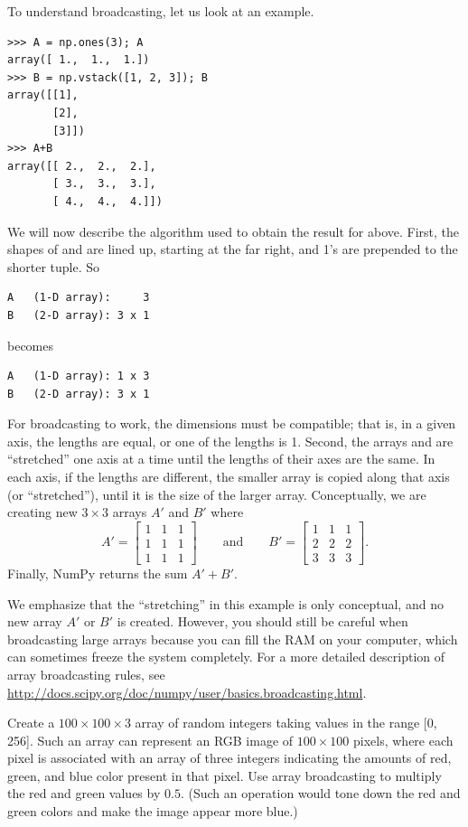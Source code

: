To understand broadcasting, let us look at an example. 
\begin{lstlisting}
>>> A = np.ones(3); A
array([ 1.,  1.,  1.])
>>> B = np.vstack([1, 2, 3]); B
array([[1],
       [2],
       [3]])
>>> A+B
array([[ 2.,  2.,  2.],
       [ 3.,  3.,  3.],
       [ 4.,  4.,  4.]])
\end{lstlisting}
We will now describe the algorithm used to obtain the result for  above. First, the shapes of  and  are lined up, starting at the far right, and 1's are prepended to the shorter tuple. So
\begin{lstlisting}
A 	(1-D array):     3
B	(2-D array): 3 x 1
\end{lstlisting}
becomes
\begin{lstlisting}
A 	(1-D array): 1 x 3
B	(2-D array): 3 x 1
\end{lstlisting}
For broadcasting to work, the dimensions must be compatible; that is, in a given axis, the lengths are equal, or one of the lengths is 1. Second, the arrays  and  are ``stretched'' one axis at a time until the lengths of their axes are the same. In each axis, if the lengths are different, the smaller array is copied along that axis (or ``stretched''), until it is the size of the larger array. Conceptually, we are creating new $3 \times 3$ arrays $A'$ and $B'$ where
\[
A' = \left[ \begin{array}{ccc}
1 & 1 & 1\\
1 & 1 & 1\\
1 & 1 & 1 \end{array} \right] \qquad \text{and} \qquad B' =  \left[ \begin{array}{ccc}
1 & 1 & 1\\
2 & 2 & 2\\
3 & 3 & 3\end{array} \right].
\]
Finally, NumPy returns the sum $A'+B'$.

We emphasize that the ``stretching'' in this example is only conceptual, and no new array $A'$ or $B'$ is created. However, 
you should still be careful when broadcasting large arrays because you can fill the 
RAM on your computer, which can sometimes freeze the system completely.
For a more detailed description of array broadcasting rules, see 
\url{http://docs.scipy.org/doc/numpy/user/basics.broadcasting.html}.

\begin{problem}
Create a $100\times100\times3$ array of random integers taking values in the range 
[0, 256]. Such an array can represent an RGB image of $100\times100$ pixels, 
where each pixel is associated with an array of three integers indicating the 
amounts of red, green, and blue color present in that pixel.
Use array broadcasting to multiply the red and green values by $0.5$. 
(Such an operation would tone down the red and green colors and make the 
image appear more blue.) 
\end{problem}

